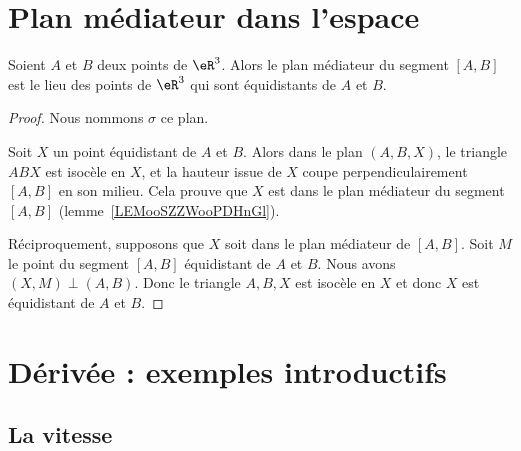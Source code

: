 \section{Plan médiateur dans l'espace}

\begin{lemma}       \label{LEMooVBVUooOTFFXT}
	Soient \( A\) et \( B\) deux points de \( \eR^3\). Alors le plan médiateur du segment \( [A,B]\) est le lieu des points de \( \eR^3\) qui sont équidistants de \( A\) et \( B\).
\end{lemma}

\begin{proof}
	Nous nommons \( \sigma\) ce plan.

	Soit \( X\) un point équidistant de \( A\) et \( B\). Alors dans le plan \( (A,B,X)\), le triangle \( ABX\) est isocèle en \( X\), et la hauteur issue de \( X\) coupe perpendiculairement \( [A,B]\) en son milieu. Cela prouve que \( X\) est dans le plan médiateur du segment \( [A,B]\) (lemme~\ref{LEMooSZZWooPDHnGl}).

	Réciproquement, supposons que \( X\) soit dans le plan médiateur de \( [A,B]\). Soit \( M\) le point du segment \( [A,B]\) équidistant de \( A\) et \( B\). Nous avons \( (X,M)\perp (A,B)\). Donc le triangle \( A,B,X\) est isocèle en \( X\) et donc \( X\) est équidistant de \( A\) et \( B\).
\end{proof}


\section{Dérivée : exemples introductifs}

\subsection{La vitesse}

